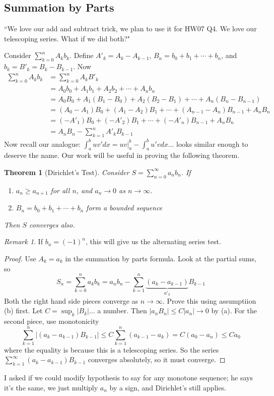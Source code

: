 \documentclass{article}
\theoremstyle{plain}
\newtheorem{theorem}{Theorem}
\theoremstyle{remark}
\newtheorem{remark}{Remark}
\begin{document}
\subsection{Summation by Parts}
``We love our add and subtract trick, we plan to use it for HW07 Q4.
We love our telescoping series.
What if we did both?"

Consider $\sum_{k=0}^n A_k b_k$.
Define $A'_k = A_k - A_{k-1}$, $B_n = b_0 + b_1 +\cdots + b_n$,
and $b_k = B'_k = B_k - B_{k-1}$.
Now
\begin{align*}
	\sum_{k=0}^n A_k b_k
	&= \sum_{k=0}^n A_k B'_k\\
	&= A_0b_0 + A_1b_1 + A_2b_2 + \cdots + A_nb_n\\
	&= A_0B_0 + A_1(B_1 - B_0) + A_2(B_2 - B_1) + \cdots + A_n(B_n - B_{n-1})\\
	&= (A_0 - A_1)B_0 + (A_1 - A_2)B_1 + \cdots + (A_{n-1} - A_n)B_{n-1} + A_nB_n\\
	&= (-A'_1)B_0 + (-A'_2)B_1 + \cdots + (-A'_n)B_{n-1} + A_nB_n\\
	&= A_nB_n - \sum_{k=1}^n A'_kB_{k-1}
\end{align*}
Now recall our analogue: $\int_a^b uv' dx = uv\vert_a^b - \int_a^bu'vdx$...
looks similar enough to deserve the name.
Our work will be useful in proving the following theorem.
\begin{theorem}[Dirichlet's Test]
	Consider $S = \sum_{n=0}^\infty a_nb_n$. If
	\begin{enumerate}
		\item $a_n \geq a_{n+1}$ for all $n$, and $a_n \to 0$ as $n \to \infty$.
		\item $B_n = b_0 + b_1 + \cdots + b_n$ form a bounded sequence
	\end{enumerate}
	Then $S$ converges also.
\end{theorem}
\begin{remark}
	If $b_n = (-1)^n$, this will give us the alternating series test.
\end{remark}
\begin{proof}
	Use $A_k = a_k$ in the summation by parts formula.
	Look at the partial sums, so
	\[
		S_n =  \sum_{k=0}^n a_kb_k
		= a_nb_n - \sum_{k=1}^n\underbrace{(a_k - a_{k-1})}_{a'_k}B_{k-1}
	\]
	Both the right hand side pieces converge as $n \to \infty$.
	Prove this using assumptiion (b) first.
	Let $C = \sup_k |B_k|$... a number.
	Then $|a_nB_n| \leq C|a_n| \to 0$ by (a).
	For the second piece, use monotonicity
	\[
		\sum_{k=1}^n \left\lvert \left( a_k - a_{k-1}\right)B_{k-1}\right\rvert
		\leq C \sum_{k=1}^n\left(a_{k-1} - a_k\right)
		= C(a_0 - a_n) \leq Ca_0
	\]
	where the equality is because this is a telescoping series.
	So the series $\sum_{k=1}^\infty(a_k - a_{k-1})B_{k-1}$ converges absolutely,
	so it must converge.
\end{proof}
I asked if we could modify hypothesis to say for any monotone sequence;
he says it's the same, we just multiply $a_n$ by a sign,
and Dirichlet's still applies.
\end{document}

